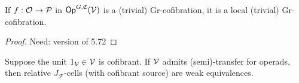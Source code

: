 \documentclass[a4paper,10pt
]{article}%
\renewcommand{\F}{\mathcal F}
\renewcommand{\1}{\ensuremath{\mathbb{id}}}
\begin{document}
\begin{lemma}
      \label{LOCAL_COF_LEM}
      If $f: \mathcal{O} \to \mathcal{P}$ in $\mathsf{Op}^{G, \mathfrak C}(\mathcal V)$ is a (trivial) $\mathrm{Gr}$-cofibration, it is a local (trivial) $\mathrm{Gr}$-cofibration.
\end{lemma}
\begin{proof}
      {\color{red} Need: version of 5.72}
\end{proof}

\begin{proposition}
      \label{J-CELL_PROP}
      Suppose the unit $1_{\mathcal V} \in \mathcal V$ is cofibrant.
      If $\mathcal V$ admits (semi)-transfer for operads, then relative $J_{\F}$-cells (with cofibrant source) are weak equivalences.
\end{proposition}
\end{document}

